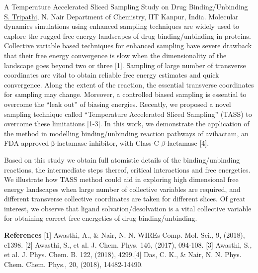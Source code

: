 
    \begin{abstract_online}{A Temperature Accelerated Sliced Sampling Study on Drug Binding/Unbinding}{%
        \underline{S. Tripathi}, N. Nair}{%
        }{%
        Department of Chemistry, IIT Kanpur, India.}
    Molecular dynamics simulations using enhanced sampling techniques are widely used to explore the rugged free energy landscapes of drug binding/unbinding in proteins. Collective variable based techniques for enhanced sampling have severe drawback that their free energy convergence is slow when the dimensionality of the landscape goes beyond two or three [1]. Sampling of large number of transverse coordinates are vital to obtain reliable free energy estimates and quick convergence. Along the extent of the reaction, the essential transverse coordinates for sampling may change. Moreover, a controlled biased sampling is essential to overcome the “leak out” of biasing energies. Recently, we proposed a novel sampling technique called “Temperature Accelerated Sliced Sampling” (TASS) to overcome these limitations [1-3]. In this work, we demonstrate the application of the method in modelling binding/unbinding reaction pathways of avibactam, an FDA approved β-lactamase inhibitor, with Class-C $\beta$-lactamase [4]. \par Based on this study we obtain full atomistic details of the binding/unbinding reactions, the intermediate steps thereof, critical interactions and free energetics. We illustrate how TASS method could aid in exploring high dimensional free energy landscapes when large number of collective variables are required, and different transverse collective coordinates are taken for different slices. Of great interest, we observe that ligand solvation/desolvation is a vital collective variable for obtaining correct free energetics of drug binding/unbinding.  
    
        \textbf{References} \newline{}[1] Awasthi, A., & Nair, N. N. WIREs Comp. Mol. Sci., 9, (2018), e1398. \newline{}[2] Awasthi, S., et al. J. Chem. Phys. 146, (2017), 094-108. \newline{}[3] Awasthi, S., et al. J. Phys. Chem. B. 122, (2018), 4299.\newline{}[4] Das, C. K., & Nair, N. N. Phys. Chem. Chem. Phys., 20, (2018), 14482-14490.
    \end{abstract_online}
    